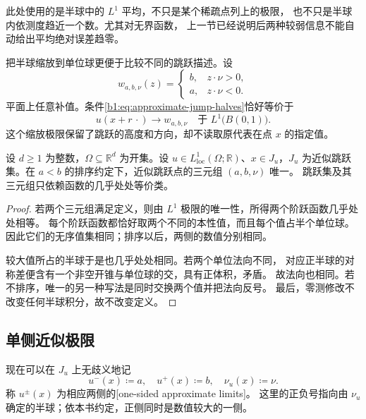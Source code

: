 此处使用的是半球中的 \(L^1\) 平均，不只是某个稀疏点列上的极限，
也不只是半球内依测度趋近一个数。尤其对无界函数，
上一节已经说明后两种较弱信息不能自动给出平均绝对误差趋零。

\ProseParagraphBreak

把半球缩放到单位球更便于比较不同的跳跃描述。设
\[
 w_{a,b,\nu}(z)=
 \begin{cases}
  b,&z\cdot\nu>0,\\
  a,&z\cdot\nu<0.
 \end{cases}
\]
平面上任意补值。条件\eqref{b1:eq:approximate-jump-halves}恰好等价于
\begin{equation}\label{b1:eq:jump-step-blowup}
 u(x+r\,\cdot)\longrightarrow w_{a,b,\nu}
 \quad\text{于 }L^1\bigl(B(0,1)\bigr).
\end{equation}
这个缩放极限保留了跳跃的高度和方向，却不读取原代表在点 \(x\) 的指定值。

\begin{proposition}\label{b1:prop:approximate-jump-uniqueness}
设 \(d\ge1\) 为整数，\(\Omega\subseteq\mathbb R^d\) 为开集。设 \(u\in L^1_{\mathrm{loc}}(\Omega;\mathbb R)\)、\(x\in J_u\)，\(J_u\) 为近似跳跃集。在 \(a<b\) 的排序约定下，近似跳跃点的三元组 \((a,b,\nu)\) 唯一。
跳跃集及其三元组只依赖函数的几乎处处等价类。
\end{proposition}
\begin{proof}
若两个三元组满足定义，则由 \(L^1\) 极限的唯一性，所得两个阶跃函数几乎处处相等。
每个阶跃函数都恰好取两个不同的本性值，而且每个值占半个单位球。
因此它们的无序值集相同；排序以后，两侧的数值分别相同。

较大值所占的半球于是也几乎处处相同。若两个单位法向不同，
对应正半球的对称差便含有一个非空开锥与单位球的交，具有正体积，矛盾。
故法向也相同。若不排序，唯一的另一种写法是同时交换两个值并把法向反号。
最后，零测修改不改变任何半球积分，故不改变定义。
\end{proof}

\subsection{单侧近似极限}
\label{b1:subsec:280202}

现在可以在 \(J_u\) 上无歧义地记
\[
 u^-(x)\coloneqq a,\quad u^+(x)\coloneqq b,\quad \nu_u(x)\coloneqq\nu.
\]
称 \(u^\pm(x)\) 为相应两侧的[one-sided approximate limits]。
这里的正负号指向由 \(\nu_u\) 确定的半球；依本书约定，正侧同时是数值较大的一侧。

